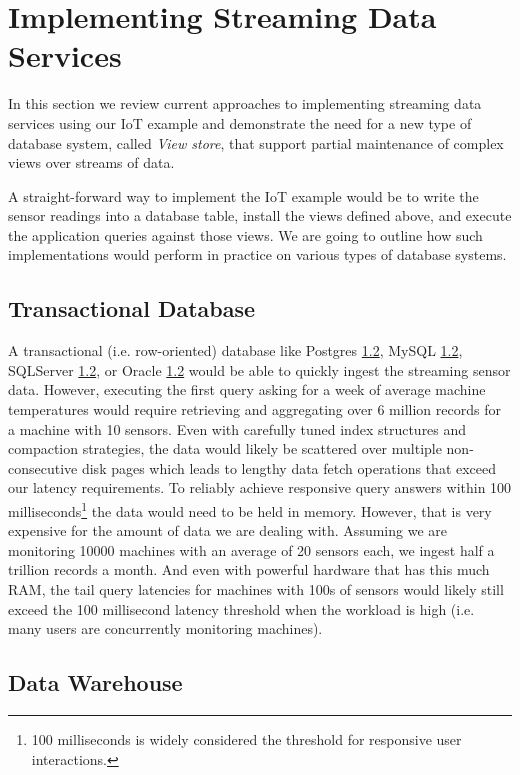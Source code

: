 \documentclass[	DIV=calc,%
							paper=letter,%
							fontsize=11pt,%
							twocolumn]{scrartcl}	 					%
\begin{document}
\section{Implementing Streaming Data Services}
\label{sec:viewstore}

In this section we review current approaches to implementing streaming data services using our IoT example and demonstrate the need for a new type of database system, called \emph{View store}, that support partial maintenance of complex views over streams of data.

A straight-forward way to implement the IoT example would be to write the sensor readings into a database table, install the views defined above, and execute the application queries against those views. We are going to outline how such implementations would perform in practice on various types of database systems.

\subsection{Transactional Database}

A transactional (i.e. row-oriented) database like Postgres \ref{}, MySQL \ref{}, SQLServer \ref{}, or Oracle \ref{} would be able to quickly ingest the streaming sensor data. However, executing the first query asking for a week of average machine temperatures would require retrieving and aggregating over 6 million records for a machine with 10 sensors. Even with carefully tuned index structures and compaction strategies, the data would likely be scattered over multiple non-consecutive disk pages which leads to lengthy data fetch operations that exceed our latency requirements. To reliably achieve responsive query answers within 100 milliseconds\footnote{100 milliseconds is widely considered the threshold for responsive user interactions.} the data would need to be held in memory. However, that is very expensive for the amount of data we are dealing with. Assuming we are monitoring 10000 machines with an average of 20 sensors each, we ingest half a trillion records a month. And even with powerful hardware that has this much RAM, the tail query latencies for machines with 100s of sensors would likely still exceed the 100 millisecond latency threshold when the workload is high (i.e. many users are concurrently monitoring machines).

\subsection{Data Warehouse}
\end{document}
